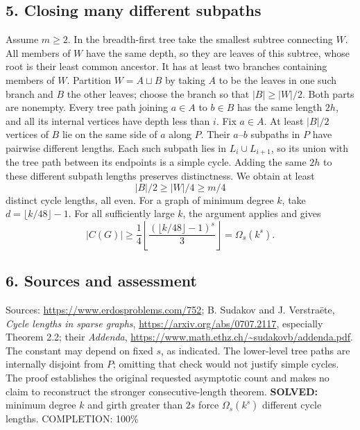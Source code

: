 \subsection*{5. Closing many different subpaths}
Assume $m\ge2$. In the breadth-first tree take the smallest subtree connecting $W$. All members of $W$ have the same depth, so they are leaves of this subtree, whose root is their least common ancestor. It has at least two branches containing members of $W$. Partition $W=A\sqcup B$ by taking $A$ to be the leaves in one such branch and $B$ the other leaves; choose the branch so that $|B|\ge|W|/2$. Both parts are nonempty.
Every tree path joining $a\in A$ to $b\in B$ has the same length $2h$, and all its internal vertices have depth less than $i$. Fix $a\in A$. At least $|B|/2$ vertices of $B$ lie on the same side of $a$ along $P$. Their $a$--$b$ subpaths in $P$ have pairwise different lengths. Each such subpath lies in $L_i\cup L_{i+1}$, so its union with the tree path between its endpoints is a simple cycle. Adding the same $2h$ to these different subpath lengths preserves distinctness. We obtain at least
\[
 |B|/2\ge |W|/4\ge m/4
\]
distinct cycle lengths, all even.
For a graph of minimum degree $k$, take $d=\lfloor k/48\rfloor-1$. For all sufficiently large $k$, the argument applies and gives
\[
 |C(G)|\ge\frac14\left\lfloor\frac{(\lfloor k/48\rfloor-1)^s}{3}\right\rfloor
 =\Omega_s(k^s).
\]
\subsection*{6. Sources and assessment}
Sources: \url{https://www.erdosproblems.com/752}; B. Sudakov and J. Verstra\"ete, \emph{Cycle lengths in sparse graphs}, \url{https://arxiv.org/abs/0707.2117}, especially Theorem 2.2; their \emph{Addenda}, \url{https://www.math.ethz.ch/~sudakovb/addenda.pdf}.
The constant may depend on fixed $s$, as indicated. The lower-level tree paths are internally disjoint from $P$; omitting that check would not justify simple cycles. The proof establishes the original requested asymptotic count and makes no claim to reconstruct the stronger consecutive-length theorem.
\textbf{SOLVED:} minimum degree $k$ and girth greater than $2s$ force $\Omega_s(k^s)$ different cycle lengths.
\noindent COMPLETION: 100\%
